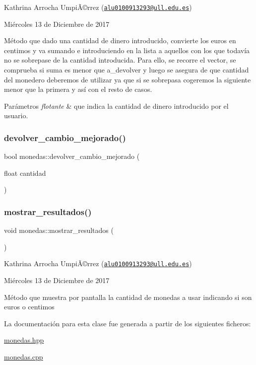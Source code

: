 Kathrina Arrocha UmpiÃ©rrez (\href{mailto:alu0100913293@ull.edu.es}{\tt alu0100913293@ull.\+edu.\+es})

Miércoles 13 de Diciembre de 2017

Método que dado una cantidad de dinero introducido, convierte los euros en centimos y va sumando e introduciendo en la lista a aquellos con los que todavía no se sobrepase de la cantidad introducida. Para ello, se recorre el vector, se comprueba si suma es menor que a\+\_\+devolver y luego se asegura de que cantidad del monedero deberemos de utilizar ya que si se sobrepasa cogeremos la siguiente menor que la primera y así con el resto de casos.


\begin{DoxyParams}{Parámetros}
{\em flotante} & que indica la cantidad de dinero introducido por el usuario. \\
\hline
\end{DoxyParams}
\mbox{\label{classmonedas_a034d41cb66e5408e5b7a377bce6046bd}} 
\subsubsection{\texorpdfstring{devolver\+\_\+cambio\+\_\+mejorado()}{devolver\_cambio\_mejorado()}}
{\footnotesize\ttfamily bool monedas\+::devolver\+\_\+cambio\+\_\+mejorado (\begin{DoxyParamCaption}\item[{float}]{cantidad }\end{DoxyParamCaption})}

\mbox{\label{classmonedas_a1fc02876da5a98ecb96e81f62fda9ec6}} 
\subsubsection{\texorpdfstring{mostrar\+\_\+resultados()}{mostrar\_resultados()}}
{\footnotesize\ttfamily void monedas\+::mostrar\+\_\+resultados (\begin{DoxyParamCaption}{ }\end{DoxyParamCaption})}

Kathrina Arrocha UmpiÃ©rrez (\href{mailto:alu0100913293@ull.edu.es}{\tt alu0100913293@ull.\+edu.\+es})

Miércoles 13 de Diciembre de 2017

Método que muestra por pantalla la cantidad de monedas a usar indicando si son euros o centimos 

La documentación para esta clase fue generada a partir de los siguientes ficheros\+:\begin{DoxyCompactItemize}
\item 
\hyperlink{monedas_8hpp}{monedas.\+hpp}\item 
\hyperlink{monedas_8cpp}{monedas.\+cpp}\end{DoxyCompactItemize}

